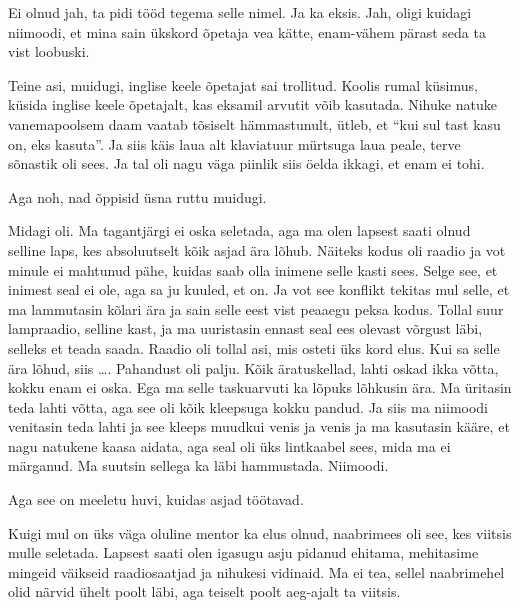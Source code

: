 
Ei olnud jah, ta pidi tööd tegema selle nimel. Ja ka eksis. Jah, oligi kuidagi niimoodi, et mina  sain ükskord õpetaja vea kätte,  enam-vähem pärast seda ta vist loobuski. 

Teine asi, muidugi, inglise keele õpetajat sai trollitud. Koolis rumal küsimus, küsida inglise keele õpetajalt, kas eksamil arvutit võib kasutada. Nihuke natuke vanemapoolsem daam vaatab tõsiselt hämmastunult, ütleb, et \enquote{kui sul tast kasu on, eks kasuta}. Ja siis käis laua alt  klaviatuur mürtsuga laua peale,  terve sõnastik oli sees. Ja tal oli nagu väga piinlik siis  öelda ikkagi, et enam ei tohi. 

Aga noh, nad õppisid üsna ruttu muidugi.


Midagi oli. Ma tagantjärgi ei oska seletada, aga ma olen lapsest saati olnud selline laps, kes absoluutselt kõik asjad ära lõhub. Näiteks kodus oli raadio ja vot minule ei mahtunud pähe, kuidas saab olla inimene selle kasti sees. Selge see, et inimest seal  ei ole, aga sa ju kuuled, et on. Ja vot see konflikt tekitas mul selle, et ma lammutasin kõlari ära ja sain selle eest vist peaaegu peksa kodus. Tollal suur lampraadio, selline kast,  ja  ma uuristasin ennast  seal ees olevast võrgust läbi, selleks et teada saada. Raadio oli tollal asi, mis osteti üks kord elus. Kui sa selle ära lõhud, siis \ldots. Pahandust oli palju. Kõik äratuskellad, lahti oskad ikka võtta, kokku enam ei oska. Ega ma selle taskuarvuti ka lõpuks lõhkusin ära. Ma üritasin teda lahti võtta, aga see oli kõik kleepsuga kokku pandud. Ja siis ma niimoodi venitasin teda lahti ja see kleeps muudkui venis ja venis ja ma kasutasin kääre, et nagu natukene kaasa aidata, aga seal oli üks lintkaabel sees, mida ma ei märganud. Ma suutsin sellega ka läbi hammustada. Niimoodi. 

Aga see on meeletu huvi, kuidas asjad töötavad. 

Kuigi mul on üks väga oluline mentor ka elus olnud, naabrimees oli see, kes viitsis mulle seletada. Lapsest saati olen igasugu asju pidanud ehitama, mehitasime mingeid väikseid raadiosaatjad ja nihukesi vidinaid. Ma ei tea, sellel naabrimehel olid närvid ühelt poolt läbi, aga teiselt poolt aeg-ajalt ta viitsis. 


